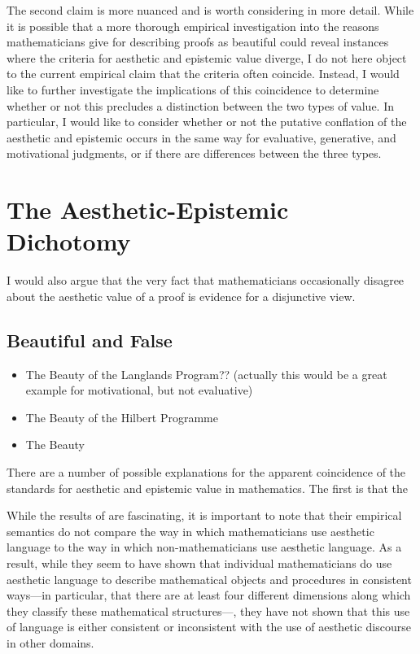 \documentclass[a4paper,man,natbib]{apa6}
\begin{document}
The second claim is more nuanced and is worth considering in more detail. While it is possible that a more thorough 
empirical investigation into the reasons mathematicians give for describing proofs as beautiful could reveal instances
where the criteria for aesthetic and epistemic value diverge, I do not here object to the current empirical claim 
that the criteria often coincide. Instead, I would like to further investigate the implications of this coincidence
to determine whether or not this precludes a distinction between the two types of value. In particular, I
would like to consider whether or not the putative conflation of the aesthetic and epistemic occurs in the same
way for evaluative, generative, and motivational judgments, or if there are differences between the three types.


\section{The Aesthetic-Epistemic Dichotomy}

I would also argue that the very fact that mathematicians occasionally disagree about the aesthetic value of a proof
is evidence for a disjunctive view.

\subsection{Beautiful and False}

\begin{itemize}
      \item The Beauty of the Langlands Program?? (actually this would be a great example for motivational, but not
            evaluative)
      \item The Beauty of the Hilbert Programme
      \item The Beauty 
\end{itemize}


There are a number of possible explanations for
the apparent coincidence of the standards for aesthetic and epistemic value in mathematics. The first is that the

While the results of \cite{inglis_beauty_2015} are fascinating, it is important to note that their empirical
semantics do not compare the way in which mathematicians use aesthetic language to the way in which non-mathematicians
use aesthetic language. As a result, while they seem to have shown that individual mathematicians do use aesthetic
language to describe mathematical objects and procedures in consistent ways---in particular, that there are
at least four different dimensions along which they classify these mathematical structures---, they have not shown that this use
of language is either consistent or inconsistent with the use of aesthetic discourse in other domains. 
\end{document}
